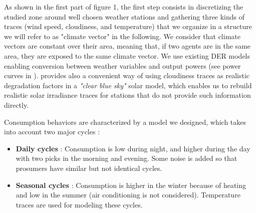 \documentclass[conference]{IEEEtran}
\begin{document}
As shown in the first part of figure 1, the first step consists in discretizing the studied zone around well chosen weather stations and gathering three kinds of traces (wind speed, cloudiness, and temperature) that we organize in a structure we will refer to as "climate vector" in the following. We consider that climate vectors are constant over their area, meaning that, if two agents are in the same area, they are exposed to the same climate vector. We use existing DER models enabling conversion between weather variables and output powers (see power curves in \cite{Kota2011} \cite{windturbinemodel}). \cite{Dans2007} provides also a convenient way of using cloudiness traces as realistic degradation factors in a \textit{"clear blue sky"} solar model, which enables us to rebuild realistic solar irradiance traces for stations that do not provide such information directly.

Consumption behaviors are characterized by a model we designed, which takes into account two major cycles : 

\begin{itemize}
\item \textbf{Daily cycles} : Consumption is low during night, and higher during the day with two picks in the morning and evening. Some noise is added so that prosumers have similar but not identical cycles.
\item \textbf{Seasonal cycles} : Consumption is higher in the winter because of heating and low in the summer (air conditioning is not considered). Temperature traces are used for modeling these cycles.
\end{itemize} 
\end{document}
